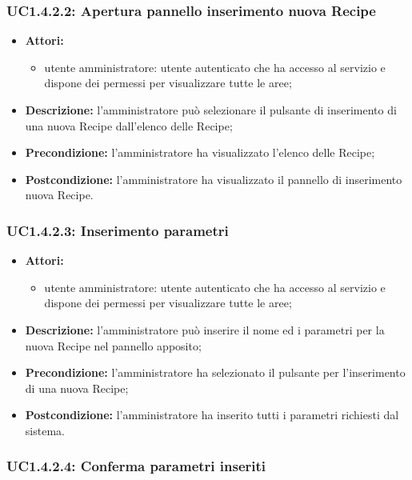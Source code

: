 \subsubsection{UC1.4.2.2: Apertura pannello inserimento nuova Recipe}

\begin{itemize}
	\item \textbf{Attori:}
	\begin{itemize}
		\item utente amministratore: utente autenticato che ha accesso al servizio e dispone dei permessi per visualizzare tutte le aree;
	\end{itemize}
	\item \textbf{Descrizione:} l'amministratore può selezionare il pulsante di inserimento di una nuova Recipe dall'elenco delle Recipe;
	\item \textbf{Precondizione:} l'amministratore ha visualizzato l'elenco delle Recipe;
	\item \textbf{Postcondizione:} l'amministratore ha visualizzato il pannello di inserimento nuova Recipe.
\end{itemize}

\subsubsection{UC1.4.2.3: Inserimento parametri}

\begin{itemize}
	\item \textbf{Attori:}
	\begin{itemize}
		\item utente amministratore: utente autenticato che ha accesso al servizio e dispone dei permessi per visualizzare tutte le aree;
	\end{itemize}
	\item \textbf{Descrizione:} l'amministratore può inserire il nome ed i parametri per la nuova Recipe nel pannello apposito;
	\item \textbf{Precondizione:} l'amministratore ha selezionato il pulsante per l'inserimento di una nuova Recipe;
	\item \textbf{Postcondizione:} l'amministratore ha inserito tutti i parametri richiesti dal sistema.
\end{itemize}

\subsubsection{UC1.4.2.4: Conferma parametri inseriti}

